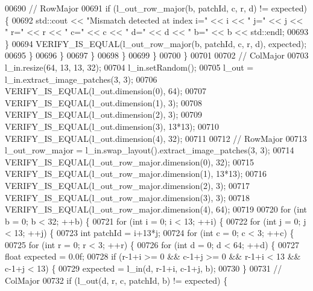 \begin{DoxyCode}
00690               \textcolor{comment}{// RowMajor}
00691               \textcolor{keywordflow}{if} (l\_out\_row\_major(b, patchId, c, r, d) != expected) \{
00692                 std::cout << \textcolor{stringliteral}{"Mismatch detected at index i="} << i << \textcolor{stringliteral}{" j="} << j << \textcolor{stringliteral}{" r="} << r << \textcolor{stringliteral}{" c="} << c
       << \textcolor{stringliteral}{" d="} << d << \textcolor{stringliteral}{" b="} << b << std::endl;
00693               \}
00694               VERIFY\_IS\_EQUAL(l\_out\_row\_major(b, patchId, c, r, d), expected);
00695             \}
00696           \}
00697         \}
00698       \}
00699     \}
00700   \}
00701 
00702   \textcolor{comment}{// ColMajor}
00703   l\_in.resize(64, 13, 13, 32);
00704   l\_in.setRandom();
00705   l\_out = l\_in.extract\_image\_patches(3, 3);
00706   VERIFY\_IS\_EQUAL(l\_out.dimension(0), 64);
00707   VERIFY\_IS\_EQUAL(l\_out.dimension(1), 3);
00708   VERIFY\_IS\_EQUAL(l\_out.dimension(2), 3);
00709   VERIFY\_IS\_EQUAL(l\_out.dimension(3), 13*13);
00710   VERIFY\_IS\_EQUAL(l\_out.dimension(4), 32);
00711 
00712   \textcolor{comment}{// RowMajor}
00713   l\_out\_row\_major = l\_in.swap\_layout().extract\_image\_patches(3, 3);
00714   VERIFY\_IS\_EQUAL(l\_out\_row\_major.dimension(0), 32);
00715   VERIFY\_IS\_EQUAL(l\_out\_row\_major.dimension(1), 13*13);
00716   VERIFY\_IS\_EQUAL(l\_out\_row\_major.dimension(2), 3);
00717   VERIFY\_IS\_EQUAL(l\_out\_row\_major.dimension(3), 3);
00718   VERIFY\_IS\_EQUAL(l\_out\_row\_major.dimension(4), 64);
00719 
00720   \textcolor{keywordflow}{for} (\textcolor{keywordtype}{int} b = 0; b < 32; ++b) \{
00721     \textcolor{keywordflow}{for} (\textcolor{keywordtype}{int} i = 0; i < 13; ++i) \{
00722       \textcolor{keywordflow}{for} (\textcolor{keywordtype}{int} j = 0; j < 13; ++j) \{
00723         \textcolor{keywordtype}{int} patchId = i+13*j;
00724         \textcolor{keywordflow}{for} (\textcolor{keywordtype}{int} c = 0; c < 3; ++c) \{
00725           \textcolor{keywordflow}{for} (\textcolor{keywordtype}{int} r = 0; r < 3; ++r) \{
00726             \textcolor{keywordflow}{for} (\textcolor{keywordtype}{int} d = 0; d < 64; ++d) \{
00727               \textcolor{keywordtype}{float} expected = 0.0f;
00728               \textcolor{keywordflow}{if} (r-1+i >= 0 && c-1+j >= 0 && r-1+i < 13 && c-1+j < 13) \{
00729                 expected = l\_in(d, r-1+i, c-1+j, b);
00730               \}
00731               \textcolor{comment}{// ColMajor}
00732               \textcolor{keywordflow}{if} (l\_out(d, r, c, patchId, b) != expected) \{

\end{DoxyCode}
